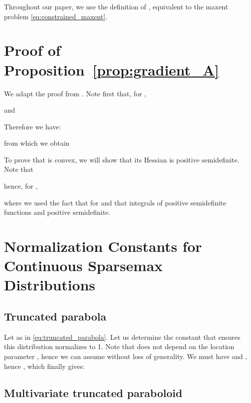 \documentclass{article}
\newcommand{\remove}[1]{}
\begin{document}
Throughout our paper, we use the definition of \citep{naudts2009q,amari2011geometry}, equivalent to the maxent problem \eqref{eq:constrained_maxent}. 

\section{Proof of Proposition~\ref{prop:gradient_A}}\label{sec:proof_gradient_A}

We adapt the proof from \citet[Theorem 5]{amari2011geometry}. 
Note first that, for ,

and


\begin{comment}
and


\end{comment}



Therefore we have:

from which we obtain


\begin{comment}

\end{comment}


To prove that  is convex, we will show that its Hessian is positive semidefinite. Note that

hence, for ,

where we used the fact that  for  and that integrals of positive semidefinite functions and positive semidefinite.

\section{Normalization Constants for Continuous Sparsemax Distributions}\label{sec:normalization_constants}

\subsection{Truncated parabola}\label{sec:proof_truncated_parabola}

Let  as in \eqref{eq:truncated_parabola}.
Let us determine the constant  that ensures this distribution normalizes to 1. Note that  does not depend on the location parameter , hence we can assume  without loss of generality. We must have
 and , hence
, which finally gives:


\remove{
The Gini negentropy of this distribution is

}

\subsection{Multivariate truncated paraboloid}\label{sec:proof_truncated_paraboloid}
\end{document}
